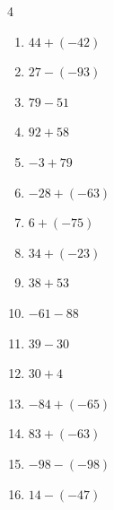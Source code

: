 \begin{multicols}{4}
\begin{enumerate}
  \item $44+(-42)$

        \phantom{$=2$}

  \item $27-(-93)$

        \phantom{$=120$}

  \item $79-51$

        \phantom{$=28$}

  \item $92+58$

        \phantom{$=150$}

  \item $-3+79$

        \phantom{$=76$}

  \item $-28+(-63)$

        \phantom{$=-91$}

  \item $6+(-75)$

        \phantom{$=-69$}

  \item $34+(-23)$

        \phantom{$=11$}

  \item $38+53$

        \phantom{$=91$}

  \item $-61-88$

        \phantom{$=-149$}

  \item $39-30$

        \phantom{$=9$}

  \item $30+4$

        \phantom{$=34$}

\columnbreak %

  \item $-84+(-65)$

        \phantom{$=-149$}

  \item $83+(-63)$

        \phantom{$=20$}

  \item $-98-(-98)$

        \phantom{$=0$}

  \item $14-(-47)$


\end{enumerate}
\end{multicols}
